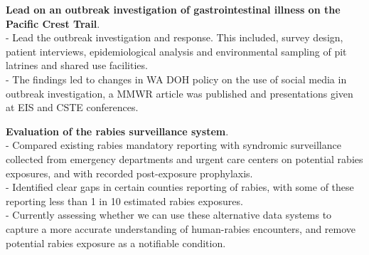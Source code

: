 \documentclass[11pt,a4paper,]{awesome-cv}
\begin{document}
\begin{cventries}
{\begin{cvitems}
\item \textbf{Lead on an outbreak investigation of gastrointestinal illness on the Pacific Crest Trail}.
    \\ - Lead the outbreak investigation and response. This included, survey design, patient interviews, epidemiological analysis and environmental sampling of pit latrines and shared use facilities.
    \\ - The findings led to changes in WA DOH policy on the use of social media in outbreak investigation, a MMWR article was published and presentations given at EIS and CSTE conferences.
\item \textbf{Evaluation of the rabies surveillance system}.
    \\ - Compared existing rabies mandatory reporting with syndromic surveillance collected from emergency departments and urgent care centers on potential rabies exposures, and with recorded post-exposure prophylaxis. 
    \\ - Identified clear gaps in certain counties reporting of rabies, with some of these reporting less than 1 in 10 estimated rabies exposures.
    \\ - Currently assessing whether we can use these alternative data systems to capture a more accurate understanding of human-rabies encounters, and remove potential rabies exposure as a notifiable condition.
\end{cvitems}}
\end{cventries}
\end{document}
